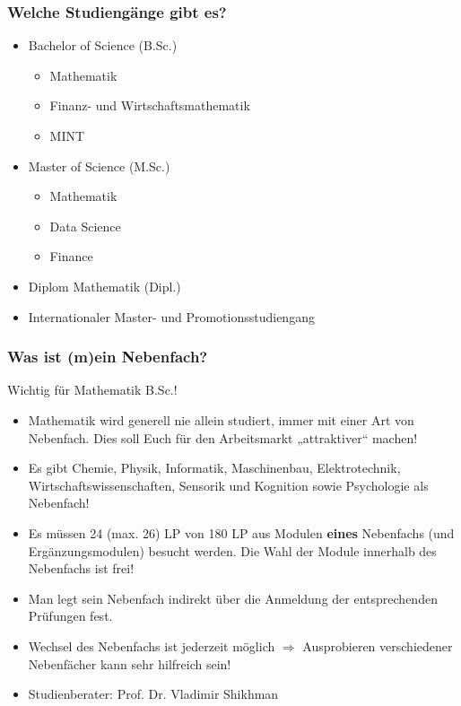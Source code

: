 \documentclass[10pt]{beamer}
\makeatletter
\newcommand{\highl}[1]{\color{tuccolor@ma}#1\color{black}}
\makeatother
\begin{document}
\begin{frame}
	\frametitle{Welche Studiengänge gibt es?}

	\begin{itemize}
		\item Bachelor of Science (B.Sc.)
			\begin{itemize}
				\item Mathematik
				\item Finanz- und Wirtschafts­mathematik
				\item MINT
			\end{itemize}
		\item Master of Science (M.Sc.)
			\begin{itemize}
				\item Mathematik
				\item Data Science
				\item Finance
			\end{itemize}
		\item Diplom Mathematik (Dipl.)
		\item Internationaler Master- und Promotions­studiengang
	\end{itemize}
\end{frame}

\begin{frame}
	\frametitle{Was ist (m)ein Nebenfach?}

	\highl{Wichtig für Mathematik B.Sc.!}

	\begin{itemize}
		\item Mathematik wird generell nie allein studiert, immer mit einer Art von Nebenfach. Dies soll Euch für den Arbeitsmarkt „attraktiver“ machen!
		\item Es gibt Chemie, Physik, Informatik, Maschinenbau, Elektrotechnik, Wirtschaftswissenschaften, Sensorik und Kognition sowie Psychologie als Nebenfach!
		\item Es müssen 24 (max. 26) LP von 180 LP aus Modulen \textbf{eines} Nebenfachs (und Ergänzungsmodulen) besucht werden. Die Wahl der Module innerhalb des Nebenfachs ist frei!
		\item Man legt sein Nebenfach indirekt über die Anmeldung der entsprechenden Prüfungen fest.
		\item Wechsel des Nebenfachs ist jederzeit möglich $\Rightarrow$ Ausprobieren verschiedener Nebenfächer kann sehr hilfreich sein!
		\item Studienberater: Prof. Dr. Vladimir Shikhman
	\end{itemize}
\end{frame}
\end{document}
